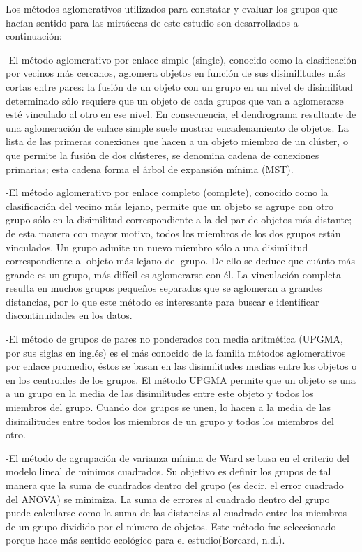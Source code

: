 \documentclass[11pt,]{article}
\begin{document}
Los métodos aglomerativos utilizados para constatar y evaluar los grupos
que hacían sentido para las mirtáceas de este estudio son desarrollados
a continuación:

-El método aglomerativo por enlace simple (single), conocido como la
clasificación por vecinos más cercanos, aglomera objetos en función de
sus disimilitudes más cortas entre pares: la fusión de un objeto con un
grupo en un nivel de disimilitud determinado sólo requiere que un objeto
de cada grupos que van a aglomerarse esté vinculado al otro en ese
nivel. En consecuencia, el dendrograma resultante de una aglomeración de
enlace simple suele mostrar encadenamiento de objetos. La lista de las
primeras conexiones que hacen a un objeto miembro de un clúster, o que
permite la fusión de dos clústeres, se denomina cadena de conexiones
primarias; esta cadena forma el árbol de expansión mínima (MST).

-El método aglomerativo por enlace completo (complete), conocido como la
clasificación del vecino más lejano, permite que un objeto se agrupe con
otro grupo sólo en la disimilitud correspondiente a la del par de
objetos más distante; de esta manera con mayor motivo, todos los
miembros de los dos grupos están vinculados. Un grupo admite un nuevo
miembro sólo a una disimilitud correspondiente al objeto más lejano del
grupo. De ello se deduce que cuánto más grande es un grupo, más difícil
es aglomerarse con él. La vinculación completa resulta en muchos grupos
pequeños separados que se aglomeran a grandes distancias, por lo que
este método es interesante para buscar e identificar discontinuidades en
los datos.

-El método de grupos de pares no ponderados con media aritmética (UPGMA,
por sus siglas en inglés) es el más conocido de la familia métodos
aglomerativos por enlace promedio, éstos se basan en las disimilitudes
medias entre los objetos o en los centroides de los grupos. El método
UPGMA permite que un objeto se una a un grupo en la media de las
disimilitudes entre este objeto y todos los miembros del grupo. Cuando
dos grupos se unen, lo hacen a la media de las disimilitudes entre todos
los miembros de un grupo y todos los miembros del otro.

-El método de agrupación de varianza mínima de Ward se basa en el
criterio del modelo lineal de mínimos cuadrados. Su objetivo es definir
los grupos de tal manera que la suma de cuadrados dentro del grupo (es
decir, el error cuadrado del ANOVA) se minimiza. La suma de errores al
cuadrado dentro del grupo puede calcularse como la suma de las
distancias al cuadrado entre los miembros de un grupo dividido por el
número de objetos. Este método fue seleccionado porque hace más sentido
ecológico para el estudio(Borcard, n.d.).
\end{document}

